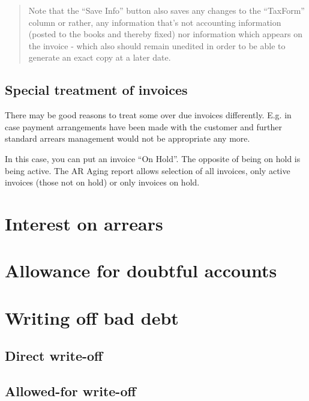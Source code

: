 \begin{quotation}
Note that the ``Save Info'' button also saves any changes to the ``TaxForm'' column or
rather, any information that's not accounting information (posted to the books and
thereby fixed) nor information which appears on the invoice - which also should remain
unedited in order to be able to generate an exact copy at a later date.
\end{quotation}


\subsection{Special treatment of invoices}
\label{subsec-workflows-credit-risk-arrears-special-treatment}

There may be good reasons to treat some over due invoices differently. E.g. in case
payment arrangements have been made with the \gls{customer} and further standard arrears
management would not be appropriate any more.

In this case, you can put an invoice ``On Hold''. The opposite of being on hold is
being active. The AR Aging report allows selection of all invoices, only active
invoices (those not on hold) or only invoices on hold.


\section{Interest on arrears}
\label{sec-workflows-credit-risk-interest-on-arrears}

\section{Allowance for doubtful accounts}
\label{sec-workflows-credit-risk-allowance-doubtful-accounts}


\section{Writing off bad debt}
\label{sec-workflows-credit-risk-bad-debt-write-off}

\subsection{Direct write-off}
\label{sec-workflows-credit-risk-bad-debt-direct-write-off}

\subsection{Allowed-for write-off}
\label{sec-workflows-credit-risk-bad-debt-allowed-write-off}

